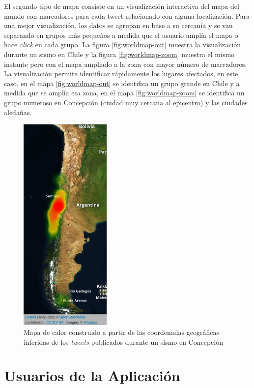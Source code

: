 	
	El segundo tipo de mapa consiste en un visualización interactiva del mapa del mundo con marcadores para cada tweet relacionado con alguna localización.
	Para una mejor visualización, los datos se agrupan en base a su cercanía y se van separando en grupos más pequeños a medida que el usuario amplía el mapa o hace \textit{click} en cada grupo. 
	La figura \ref{fig:worldmap-out} muestra la visualización durante un sismo en Chile y la figura \ref{fig:worldmap-zoom} muestra el mismo instante pero con el mapa ampliado a la zona con mayor número de marcadores.
	La visualización permite identificar rápidamente los lugares afectados, en este caso, en el mapa \ref{fig:worldmap-out} se identifica un grupo grande en Chile y a medida que se amplía esa zona, en el mapa \ref{fig:worldmap-zoom} se identifica un grupo numeroso en Concepción (ciudad muy cercana al epicentro) y las ciudades aledañas.
	
	\begin{figure}[!ht]
	  \centering
	  \includegraphics[trim={0 0 0 0}, clip, width=0.4\textwidth]{imagenes/heatmap.png}
	  \caption{Mapa de calor construido a partir de las coordenadas geográficas inferidas de los \textit{tweets} publicados durante un sismo en Concepción}
	\label{fig:heatmap}
	\end{figure}
  	

\section{Usuarios de la Aplicación}

